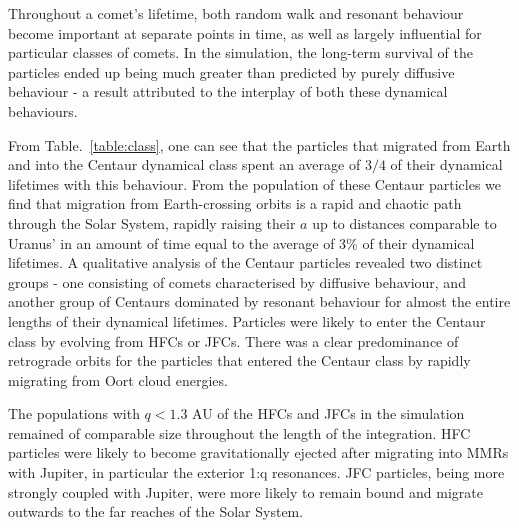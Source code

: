 Throughout a comet's lifetime, both random walk and resonant behaviour become important at separate points in time, as well as largely influential for particular classes of comets. In the simulation, the long-term survival of the particles ended up being much greater than predicted by purely diffusive behaviour - a result attributed to the interplay of both these dynamical behaviours.

From Table.~\ref{table:class}, one can see that the particles that migrated from Earth and into the Centaur dynamical class spent an average of $3/4$ of their dynamical lifetimes with this behaviour. From the population of these Centaur particles we find that migration from Earth-crossing orbits is a rapid and chaotic path through the Solar System, rapidly raising their $a$ up to distances comparable to Uranus' in an amount of time equal to the average of 3\% of their dynamical lifetimes. A qualitative analysis of the Centaur particles revealed two distinct groups - one consisting of comets characterised by diffusive behaviour, and another group of Centaurs dominated by resonant behaviour for almost the entire lengths of their dynamical lifetimes. Particles were likely to enter the Centaur class by evolving from HFCs or JFCs. There was a clear predominance of retrograde orbits for the particles that entered the Centaur class by rapidly migrating from Oort cloud energies.

The populations with $q < 1.3$ AU of the HFCs and JFCs in the simulation remained of comparable size throughout the length of the integration. HFC particles were likely to become gravitationally ejected after migrating into MMRs with Jupiter, in particular the exterior 1:q resonances. JFC particles, being more strongly coupled with Jupiter, were more likely to remain bound and migrate outwards to the far reaches of the Solar System.

